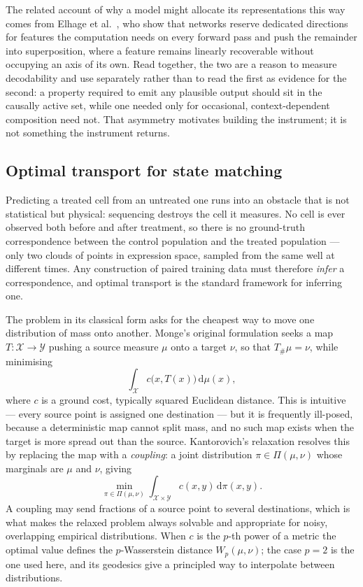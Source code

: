 The related account of why a model might allocate its representations this way comes from
Elhage et al.~\cite{superposition}, who show that networks reserve dedicated directions for features
the computation needs on every forward pass and push the remainder into superposition, where a
feature remains linearly recoverable without occupying an axis of its own. Read together, the two
are a reason to measure decodability and use separately rather than to read the first as evidence
for the second: a property required to emit any plausible output should sit in the causally active
set, while one needed only for occasional, context-dependent composition need not. That asymmetry
motivates building the instrument; it is not something the instrument returns.

\subsection{Optimal transport for state matching}
\label{sec:lit-ot}

Predicting a treated cell from an untreated one runs into an obstacle that is not statistical but
physical: sequencing destroys the cell it measures. No cell is ever observed both before and after
treatment, so there is no ground-truth correspondence between the control population and the treated
population --- only two clouds of points in expression space, sampled from the same well at different
times. Any construction of paired training data must therefore \emph{infer} a correspondence, and
optimal transport is the standard framework for inferring one.

The problem in its classical form asks for the cheapest way to move one distribution of mass onto
another. Monge's original formulation seeks a map $T : \mathcal{X} \rightarrow \mathcal{Y}$ pushing a
source measure $\mu$ onto a target $\nu$, so that $T_{\#}\mu = \nu$, while minimising
\begin{equation}
  \int_{\mathcal{X}} c\big(x, T(x)\big)\,\mathrm{d}\mu(x),
\end{equation}
where $c$ is a ground cost, typically squared Euclidean distance. This is intuitive --- every source
point is assigned one destination --- but it is frequently ill-posed, because a deterministic map
cannot split mass, and no such map exists when the target is more spread out than the source.
Kantorovich's relaxation resolves this by replacing the map with a \emph{coupling}: a joint
distribution $\pi \in \Pi(\mu,\nu)$ whose marginals are $\mu$ and $\nu$, giving
\begin{equation}
  \min_{\pi \in \Pi(\mu,\nu)} \int_{\mathcal{X}\times\mathcal{Y}} c(x,y)\,\mathrm{d}\pi(x,y).
\end{equation}
A coupling may send fractions of a source point to several destinations, which is what makes the
relaxed problem always solvable and appropriate for noisy, overlapping empirical distributions. When
$c$ is the $p$-th power of a metric the optimal value defines the $p$-Wasserstein distance
$W_p(\mu,\nu)$; the case $p=2$ is the one used here, and its geodesics give a principled way to
interpolate between distributions.

